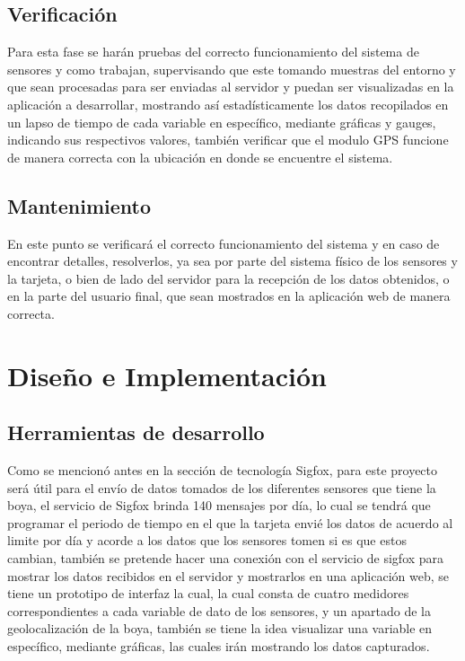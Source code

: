 \documentclass[12pt]{book}
\begin{document}
 \section{Verificación}
 Para esta fase se harán pruebas del correcto funcionamiento del sistema de sensores y como trabajan, supervisando que este tomando muestras del entorno y que sean procesadas para ser enviadas al servidor y puedan ser visualizadas en la aplicación a desarrollar, mostrando así estadísticamente los datos recopilados en un lapso de tiempo de cada variable en específico, mediante gráficas y gauges, indicando sus respectivos valores, también verificar que el modulo GPS funcione de manera correcta con la ubicación en donde se encuentre el sistema.
 
 \section{Mantenimiento}
 En este punto se verificará el correcto funcionamiento del sistema y en caso de encontrar detalles, resolverlos, ya sea por parte del sistema físico de los sensores y la tarjeta, o bien de lado del servidor para la recepción de los datos obtenidos, o en la parte del usuario final, que sean mostrados en la aplicación web de manera correcta.

\chapter{Diseño e Implementación}

\section{Herramientas de desarrollo}
Como se mencionó antes en la sección de tecnología Sigfox, para este proyecto será útil para el envío de datos tomados de los diferentes sensores que tiene la boya, el servicio de Sigfox brinda 140 mensajes por día, lo cual se tendrá que programar el periodo de tiempo en el que la tarjeta envié los datos de acuerdo al limite por día y acorde a los datos que los sensores tomen si es que estos cambian, también se pretende hacer una conexión con el servicio de sigfox para mostrar los datos recibidos en el servidor y mostrarlos en una aplicación web, se tiene un prototipo de interfaz la cual, la cual consta de cuatro medidores correspondientes a cada variable de dato de los sensores, y un apartado de la geolocalización de la boya, también se tiene la idea visualizar una variable en específico, mediante gráficas, las cuales irán mostrando los datos capturados.
\end{document}
